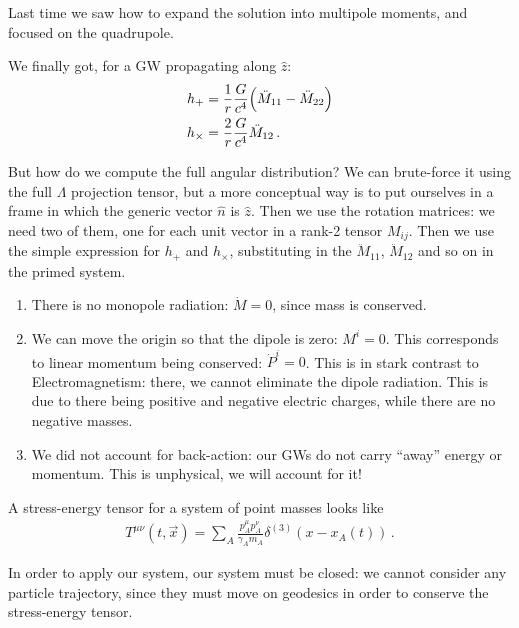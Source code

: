 \documentclass[main.tex]{subfiles}
\begin{document}

Last time we saw how to expand the solution into multipole moments, and focused on the quadrupole. 

We finally got, for a GW propagating along \(\hat{z}\): 
%
\begin{align}
h_{+} &= \frac{1}{r} \frac{G}{c^{4}} \qty(\ddot{M}_{11} - \ddot{M}_{22})  \\
h_{ \times } &= \frac{2}{r} \frac{G}{c^{4}} \ddot{M}_{12}
\,.
\end{align}

But how do we compute the full angular distribution? 
We can brute-force it using the full \(\Lambda \) projection tensor, but a more conceptual way is to put ourselves in a frame in which the generic vector \(\hat{n}\) is \(\hat{z}\). 
Then we use the rotation matrices: we need two of them, one for each unit vector in a rank-2 tensor \(M_{ij}\). 
Then we use the simple expression for \(h_{+}\) and \(h_{ \times }\), substituting in the \(\ddot{M}_{11}\), \(\ddot{M}_{12}\) and so on in the primed system. 

\begin{enumerate}
  \item There is no monopole radiation: \(\dot{M} = 0\), since mass is conserved.
  \item We can move the origin so that the dipole is zero: \(M^{i} =0 \). This corresponds to linear momentum being conserved: \(\dot{P}^{i}=0\). This is in stark contrast to Electromagnetism: there, we cannot eliminate the dipole radiation. This is due to there being positive and negative electric charges, while there are no negative masses. 
  \item We did not account for back-action: our GWs do not carry ``away'' energy or momentum. This is unphysical, we will account for it!
\end{enumerate}

A stress-energy tensor for a system of point masses looks like 
%
\begin{align}
T^{\mu \nu }(t, \vec{x}) = \sum _{A} \frac{p^{\mu }_{A} p^{\nu }_{A}}{\gamma_{A}  m_{A}} \delta^{(3)} (x - x_{A}(t))
\,.
\end{align}

In order to apply our system, our system must be closed: we cannot consider any particle trajectory, since they must move on geodesics in order to conserve the stress-energy tensor. 
\end{document}
